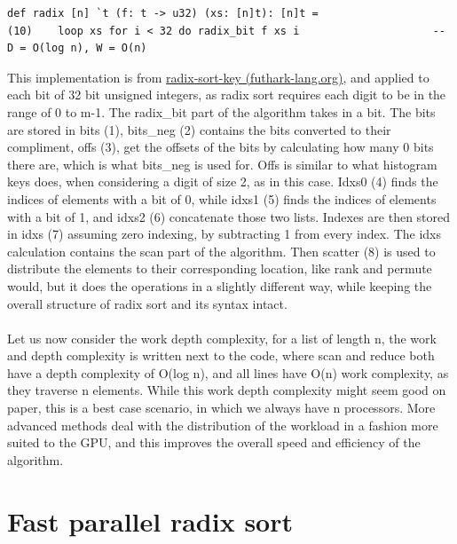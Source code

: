 \documentclass{article}
\begin{document}
\begin{itemize}
\begin{lstlisting}
def radix [n] `t (f: t -> u32) (xs: [n]t): [n]t = 
(10)    loop xs for i < 32 do radix_bit f xs i                     -- D = O(log n), W = O(n)
\end{lstlisting}

This implementation is from \href{https://futhark-lang.org/examples/radix-sort-key.html}{radix-sort-key (futhark-lang.org)}, and applied to each bit of 32 bit unsigned integers, as radix sort requires each digit to be in the range of 0 to m-1. The radix\_bit part of the algorithm takes in a bit. The bits are stored in bits (1), bits\_neg (2) contains the bits converted to their compliment, offs (3), get the offsets of the bits by calculating how many 0 bits there are, which is what bits\_neg is used for. Offs is similar to what histogram keys does, when considering a digit of size 2, as in this case. Idxs0 (4) finds the indices of elements with a bit of 0, while idxs1 (5) finds the indices of elements with a bit of 1, and idxs2 (6) concatenate those two lists. Indexes are then stored in idxs (7) assuming zero indexing, by subtracting 1 from every index. The idxs calculation contains the scan part of the algorithm. Then scatter (8) is used to distribute the elements to their corresponding location, like rank and permute would, but it does the operations in a slightly different way, while keeping the overall structure of radix sort and its syntax intact. 
\\ \\
Let us now consider the work depth complexity, for a list of length n, the work and depth complexity is written next to the code, where scan and reduce both have a depth complexity of O(log n), and all lines have O(n) work complexity, as they traverse n elements. While this work depth complexity might seem good on paper, this is a best case scenario, in which we always have n processors. More advanced methods deal with the distribution of the workload in a fashion more suited to the GPU, and this improves the overall speed and efficiency of the algorithm. 
\end{itemize}

\section{Fast parallel radix sort}
\end{document}
